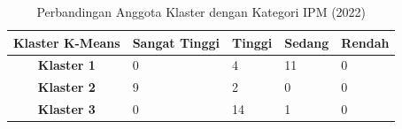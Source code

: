 \begin{table}[H]
\centering
\caption{Perbandingan Anggota Klaster dengan Kategori IPM (2022)} \label{tab:ipm_cross_2022}
\begin{tabular}{|c|p{2cm}|p{2cm}|p{2cm}|p{2cm}|}
\hline
\textbf{Klaster K-Means} & \textbf{Sangat Tinggi} & \textbf{Tinggi} & \textbf{Sedang} & \textbf{Rendah} \\ \hline
\textbf{Klaster 1} & 0 & 4 & 11 & 0 \\ \hline
\textbf{Klaster 2} & 9 & 2 & 0 & 0 \\ \hline
\textbf{Klaster 3} & 0 & 14 & 1 & 0 \\ \hline
\end{tabular}
\end{table}